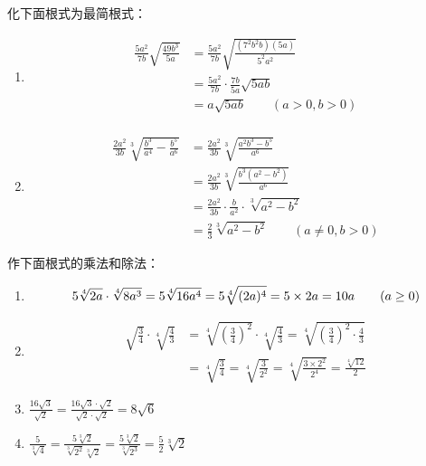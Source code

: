 \begin{example}
    化下面根式为最简根式：
\begin{enumerate}
    \item \[\begin{split}
        \frac{5 a^{2}}{7 b}\sqrt{\frac{49 b^{3}}{5 a}} &=\frac{5 a^{2}}{7 b} \sqrt{\frac{\left(7^{2} b^{2} b\right)(5 a)}{5^{2} a^{2}}} \\
    &=\frac{5 a^{2}}{7 b} \cdot \frac{7 b}{5 a} \sqrt{5 a b} \\
    &=a \sqrt{5 a b} \qquad(a>0, b>0) \\
    \end{split}\]
    \item \[\begin{split}
        \frac{2 a^{2}}{3 b} \sqrt[3]{\frac{b^{3}}{a^{4}}-\frac{b^{5}}{a^{6}}} &=\frac{2 a^{2}}{3 b}\sqrt[3]{\frac{a^{2} b^{3}-b^{5}}{a^{6}}} \\
    &=\frac{2 a^{2}}{3 b} \sqrt[3]{\frac{b^{3}\left(a^{2}-b^{2}\right)}{a^{6}}} \\
    &=\frac{2 a^{2}}{3 b} \cdot \frac{b}{a^{2}} \cdot \sqrt[3]{a^{2}-b^{2}} \\
    &=\frac{2}{3} \sqrt[3]{a^{2}-b^{2}} \qquad(a \neq 0, b>0)
    \end{split}\]
\end{enumerate}
\end{example}

\begin{example}
    作下面根式的乘法和除法：
\begin{enumerate}
    \item $$5\sqrt[4]{2a}\cdot \sqrt[4]{8a^3}=5\sqrt[4]{16a^4}=5\sqrt[4]{(2a)^4}=5\times 2a=10a\qquad (a\ge 0)$$
    \item \[\begin{split}
        \sqrt{\frac{3}{4}} \cdot \sqrt[4]{\frac{4}{3}}&=\sqrt[4]{\left(\frac{3}{4}\right)^{2}} \cdot \sqrt[4]{\frac{4}{3}}=\sqrt[4]{\left(\frac{3}{4}\right)^{2} \cdot \frac{4}{3}}\\
&=\sqrt[4]{\frac{3}{4}}=\sqrt[4]{\frac{3}{2^{2}}}=\sqrt[4]{\frac{3 \times 2^{2}}{2^{4}}}=\frac{\sqrt[4]{12}}{2}
    \end{split}\]
    \item $\frac{16 \sqrt{3}}{\sqrt{2}}=\frac{16 \sqrt{3} \cdot \sqrt{2}}{\sqrt{2} \cdot \sqrt{2}}=8 \sqrt{6}$
    \item $\frac{5}{\sqrt[3]{4}}=\frac{5 \sqrt[3]{2}}{\sqrt[3]{2^2} \sqrt[3]{2}}=\frac{5 \sqrt[3]{2}}{\sqrt[3]{2^{3}}}=\frac{5}{2} \sqrt[3]{2}$
\end{enumerate}
\end{example}

